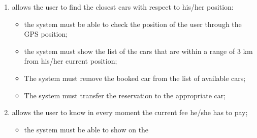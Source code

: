 \begin{enumerate}
\item allows the user to find the closest cars with respect to his/her position:

\begin{itemize}
\item the system must be able to check the position of the user through the GPS position;
\item the system must show the list of the cars that are within a range of 3 km from his/her current position;
\item The system must remove the booked car from the list of available cars;
\item The system must transfer the reservation to the appropriate car;
\end{itemize}

\item allows the user to know in every moment the current fee he/she has to pay;

\begin{itemize}
\item the system must be able to show on the 
\end{itemize}


\end{enumerate}
